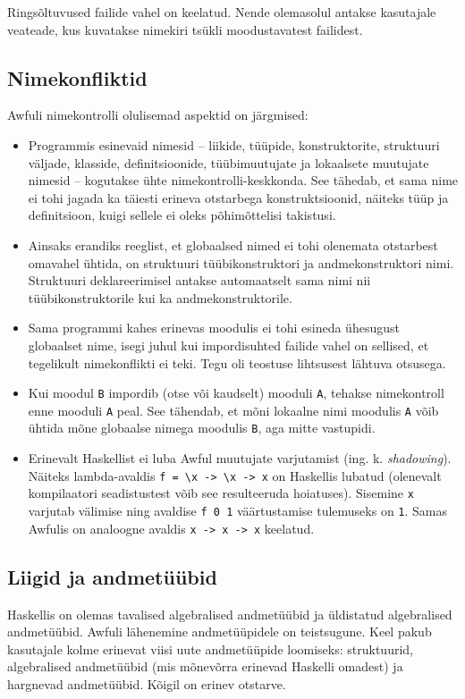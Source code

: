 \documentclass[12pt]{article}
\begin{document}
      Ringsõltuvused failide vahel on keelatud. Nende olemasolul antakse kasutajale veateade, kus kuvatakse nimekiri tsükli moodustavatest failidest.
    \subsection{Nimekonfliktid}
      Awfuli nimekontrolli olulisemad aspektid on järgmised:

      \begin{itemize}
        \item
          Programmis esinevaid nimesid -- liikide, tüüpide, konstruktorite, struktuuri väljade, klasside, definitsioonide, tüübimuutujate ja lokaalsete muutujate nimesid -- kogutakse ühte nimekontrolli-keskkonda. See tähedab, et sama nime ei tohi jagada ka täiesti erineva otstarbega konstruktsioonid, näiteks tüüp ja definitsioon, kuigi sellele ei oleks põhimõttelisi takistusi.
        \item
          Ainsaks erandiks reeglist, et globaalsed nimed ei tohi olenemata otstarbest omavahel ühtida, on struktuuri tüübikonstruktori ja andmekonstruktori nimi. Struktuuri deklareerimisel antakse automaatselt sama nimi nii tüübikonstruktorile kui ka andmekonstruktorile.
        \item
          Sama programmi kahes erinevas moodulis ei tohi esineda ühesugust globaalset nime, isegi juhul kui impordisuhted failide vahel on sellised, et tegelikult nimekonflikti ei teki. Tegu oli teostuse lihtsusest lähtuva otsusega.
        \item
          Kui moodul \verb!B! impordib (otse või kaudselt) mooduli \verb!A!, tehakse nimekontroll enne mooduli \verb!A! peal. See tähendab, et mõni lokaalne nimi moodulis \verb!A! võib ühtida mõne globaalse nimega moodulis \verb!B!, aga mitte vastupidi.
        \item
          Erinevalt Haskellist ei luba Awful muutujate varjutamist (ing. k. \textit{shadowing}). Näiteks lambda-avaldis \verb!f = \x -> \x -> x! on Haskellis lubatud (olenevalt kompilaatori seadistustest võib see resulteeruda hoiatuses). Sisemine \verb!x! varjutab välimise ning avaldise \verb!f 0 1! väärtustamise tulemuseks on \verb!1!. Samas Awfulis on analoogne avaldis \verb!x -> x -> x! keelatud.
      \end{itemize}
    \subsection{Liigid ja andmetüübid}
      Haskellis on olemas tavalised algebralised andmetüübid ja üldistatud algebralised andmetüübid. Awfuli lähenemine andmetüüpidele on teistsugune. Keel pakub kasutajale kolme erinevat viisi uute andmetüüpide loomiseks: struktuurid, algebralised andmetüübid (mis mõnevõrra erinevad Haskelli omadest) ja hargnevad andmetüübid. Kõigil on erinev otstarve.
\end{document}
